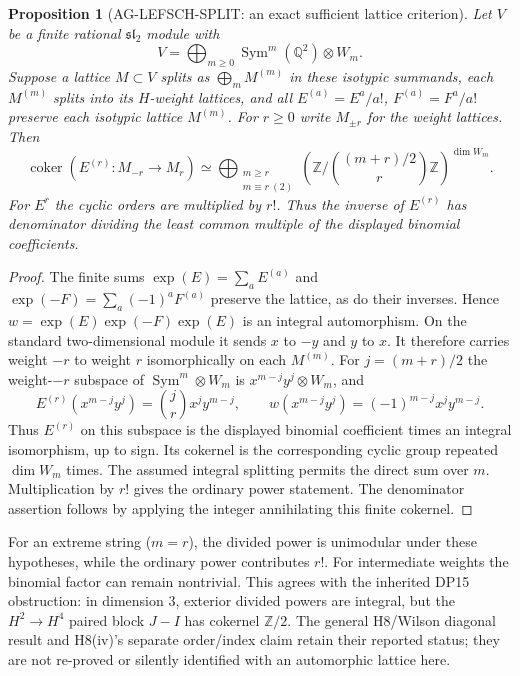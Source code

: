 \documentclass[11pt,a4paper]{article}
\newtheorem{proposition}{Proposition}
\begin{document}
\begin{proposition}[AG-LEFSCH-SPLIT: an exact sufficient lattice criterion]
Let $V$ be a finite rational $\mathfrak{sl}_2$ module with
\[
 V=\bigoplus_{m\ge0}
       \operatorname{Sym}^m(\mathbb Q^2)\otimes W_m.
\]
Suppose a lattice $M\subset V$ splits as
$\bigoplus_m M^{(m)}$ in these isotypic summands, each
$M^{(m)}$ splits into its $H$-weight lattices, and all
$E^{(a)}=E^a/a!$, $F^{(a)}=F^a/a!$ preserve each
isotypic lattice $M^{(m)}$.
For $r\ge0$ write $M_{\pm r}$ for the weight lattices.
Then
\begin{equation}\label{ag:integral-lefschetz-test}
 \operatorname{coker}
  (E^{(r)}:M_{-r}\longrightarrow M_r)
 \simeq
 \bigoplus_{\substack{m\ge r\\m\equiv r\ (2)}}
 \left(\mathbb Z/
     \binom{(m+r)/2}{r}\mathbb Z\right)^{\dim W_m}.
\end{equation}
For $E^r$ the cyclic orders are multiplied by $r!$.
Thus the inverse of $E^{(r)}$ has denominator dividing the
least common multiple of the displayed binomial coefficients.
\end{proposition}
\begin{proof}
The finite sums $\exp(E)=\sum_aE^{(a)}$ and
$\exp(-F)=\sum_a(-1)^aF^{(a)}$ preserve the lattice,
as do their inverses. Hence
$w=\exp(E)\exp(-F)\exp(E)$ is an integral automorphism.
On the standard two-dimensional module it sends $x$ to $-y$
and $y$ to $x$. It therefore carries weight $-r$ to weight
$r$ isomorphically on each $M^{(m)}$.
For $j=(m+r)/2$ the weight-$-r$ subspace of
$\operatorname{Sym}^m\otimes W_m$ is
$x^{m-j}y^j\otimes W_m$, and
\[
 E^{(r)}(x^{m-j}y^j)
   =\binom{j}{r}x^jy^{m-j},\qquad
 w(x^{m-j}y^j)=(-1)^{m-j}x^jy^{m-j}.
\]
Thus $E^{(r)}$ on this subspace is the displayed binomial
coefficient times an integral isomorphism, up to sign.
Its cokernel is the corresponding cyclic group repeated
$\dim W_m$ times. The assumed integral splitting permits the
direct sum over $m$. Multiplication by $r!$ gives the ordinary
power statement. The denominator assertion follows by applying
the integer annihilating this finite cokernel.
\end{proof}

For an extreme string ($m=r$), the divided power is unimodular
under these hypotheses, while the ordinary power contributes
$r!$. For intermediate weights the binomial factor can remain
nontrivial. This agrees with the inherited DP15 obstruction:
in dimension $3$, exterior divided powers are integral, but
the $H^2\to H^4$ paired block $J-I$ has cokernel
$\mathbb Z/2$. The general H8/Wilson diagonal result and
H8(iv)'s separate order/index claim retain their reported
status; they are not re-proved or silently identified with an
automorphic lattice here.
\end{document}
